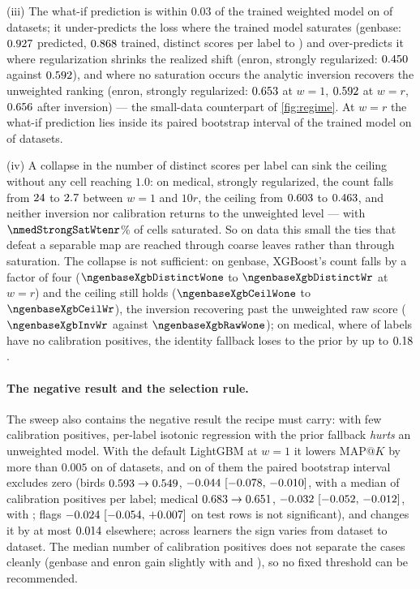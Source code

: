 \documentclass[sigconf,nonacm]{acmart}
\makeatletter
\newcommand{\mapk}{\mathrm{MAP}@K\xspace}
\makeatother
\begin{document}
(iii) The what-if prediction is within $0.03$ of the trained weighted model on \nnWhatifClose{} of \nnMulan{} datasets; it under-predicts the loss where the trained model saturates (genbase: $0.927$ predicted, $0.868$ trained, distinct scores per label \ngenbaseDistinctWone{} to \ngenbaseDistinctWr) and over-predicts it where regularization shrinks the realized shift (enron, strongly regularized: $0.450$ against $0.592$), and where no saturation occurs the analytic inversion recovers the unweighted ranking (enron, strongly regularized: $0.653$ at $w{=}1$, $0.592$ at $w{=}r$, $0.656$ after inversion) --- the small-data counterpart of \cref{fig:regime}. At $w{=}r$ the what-if prediction lies inside its paired bootstrap interval of the trained model on \nnWhatifCiCoversZero{} of \nnMulan{} datasets.

(iv) A collapse in the number of distinct scores per label can sink the ceiling without any cell reaching $1.0$: on medical, strongly regularized, the count falls from $24$ to $2.7$ between $w{=}1$ and $10r$, the ceiling from $0.603$ to $0.463$, and neither inversion nor calibration returns to the unweighted level --- with $\nmedStrongSatWtenr$\% of cells saturated. So on data this small the ties that defeat a separable map are reached through coarse leaves rather than through saturation. The collapse is not sufficient: on genbase, XGBoost's count falls by a factor of four ($\ngenbaseXgbDistinctWone$ to $\ngenbaseXgbDistinctWr$ at $w{=}r$) and the ceiling still holds ($\ngenbaseXgbCeilWone$ to $\ngenbaseXgbCeilWr$), the inversion recovering past the unweighted raw score ($\ngenbaseXgbInvWr$ against $\ngenbaseXgbRawWone$); on medical, where \nmedDeadCal{} of \nmedL{} labels have no calibration positives, the identity fallback loses to the prior by up to $0.18$.

\paragraph{The negative result and the selection rule.} The sweep also contains the negative result the recipe must carry: with few calibration positives, per-label isotonic regression with the prior fallback \emph{hurts} an unweighted model. With the default LightGBM at $w{=}1$ it lowers $\mapk$ by more than $0.005$ on \nnHurtDefault{} of \nnMulan{} datasets, and on \nnHurtTauZeroCI{} of them the paired bootstrap interval excludes zero (birds $0.593\to0.549$, $-0.044~[-0.078,\,-0.010]$, with a median of \ncalPosMedBirds{} calibration positives per label; medical $0.683\to0.651$, $-0.032~[-0.052,\,-0.012]$, with \ncalPosMedMedical; flags $-0.024~[-0.054,\,+0.007]$ on \nflagsNtest{} test rows is not significant), and changes it by at most $0.014$ elsewhere; across learners the sign varies from dataset to dataset. The median number of calibration positives does not separate the cases cleanly (genbase and enron gain slightly with \ncalPosMedGenbase{} and \ncalPosMedEnron), so no fixed threshold can be recommended.
\end{document}
